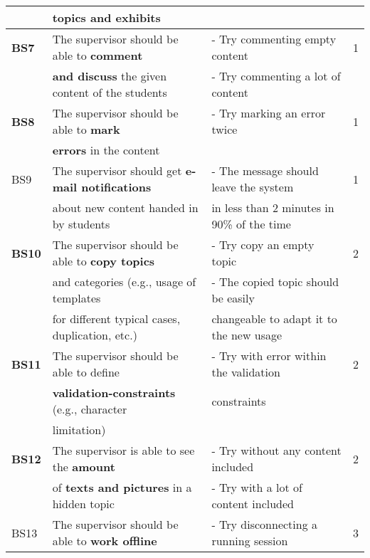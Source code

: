 \documentclass[twoside,openright,fleqn,pointlessnumbers,headinclude,,11pt,a4paper,BCOR5mm,footinclude,cleardoubleempty,abstracton %
                ]{scrreprt}
\begin{document}
\begin{table}[h]
\begin{tabular}{llll}
	 	& \textbf{topics} and exhibits  				    		&  	& \\
	\hline
	\textbf{BS7} 	& The supervisor should be able to \textbf{comment} 		& - Try commenting empty content		& 1\\
		& \textbf{and discuss} the given content of the students 	&- Try commenting a lot of content		& \\	
	\hline
	\textbf{BS8} 	& The supervisor should be able to \textbf{mark} 	& - Try marking an error twice & 1\\
		& \textbf{errors} in the content					&	& \\
	\hline
	BS9 	& The supervisor should get \textbf{e-mail notifications} 	& - The message should leave the system  & 1\\
		& about new content handed in by students		& in less than 2 minutes in 90\% of the time	& \\
	\hline
	\textbf{BS10}& The supervisor should be able to \textbf{copy topics} 		& - Try copy an empty topic  		& 2\\
		& and categories (e.g., usage of templates				& - The copied topic should be easily		&		\\
		& for different typical cases, duplication, etc.)				& changeable to adapt it to the new usage		& \\
	\hline
	\textbf{BS11}& The supervisor should be able to define 				& - Try with error within the validation & 2\\
		& \textbf{validation-constraints} (e.g., character			& constraints & \\
		& limitation)										& 			& \\
	\hline
	\textbf{BS12}& The supervisor is able to see the \textbf{amount}		& - Try without any content included & 2\\
		& of \textbf{texts and pictures} in a hidden topic			& - Try with a lot of content included	& \\
	\hline
	BS13& The supervisor should be able to \textbf{work offline} 	& - Try disconnecting a running session & 3\\
	\hline
	\end{tabular}
	\label{RequirementsBackendSupervisor}
	\end{table}
\end{document}
